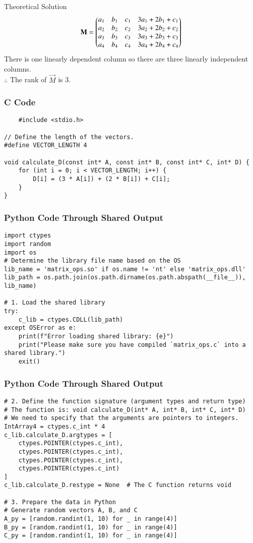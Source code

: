 \documentclass{beamer}
\begin{document}
\begin{frame}{Theoretical Solution}
\begin{align}
    \mathbf{M}=\begin{pmatrix}a_1 & b_1 & c_1 & 3a_1+2b_1+c_1\\
a_2 & b_2 & c_2 & 3a_2+2b_2+c_2 \\
a_3 & b_3 & c_3 & 3a_3+2b_3+c_3 \\
a_4 & b_4 & c_4 & 3a_4+2b_4+c_4\end{pmatrix}
\end{align}
There is one linearly dependent column so there are three linearly independent columns.\\
$\therefore$ The rank of $\vec{M}$ is 3.
\end{frame}
\begin{frame}[fragile]
\frametitle{C Code}
\begin{lstlisting}
    #include <stdio.h>

// Define the length of the vectors.
#define VECTOR_LENGTH 4

void calculate_D(const int* A, const int* B, const int* C, int* D) {
    for (int i = 0; i < VECTOR_LENGTH; i++) {
        D[i] = (3 * A[i]) + (2 * B[i]) + C[i];
    }
}
\end{lstlisting}
\end{frame}
\begin{frame}[fragile]
\frametitle{Python Code Through Shared Output}
\begin{lstlisting}
import ctypes
import random
import os
# Determine the library file name based on the OS
lib_name = 'matrix_ops.so' if os.name != 'nt' else 'matrix_ops.dll'
lib_path = os.path.join(os.path.dirname(os.path.abspath(__file__)), lib_name)

# 1. Load the shared library
try:
    c_lib = ctypes.CDLL(lib_path)
except OSError as e:
    print(f"Error loading shared library: {e}")
    print("Please make sure you have compiled `matrix_ops.c` into a shared library.")
    exit()
\end{lstlisting}
\end{frame}
\begin{frame}[fragile]
\frametitle{Python Code Through Shared Output}
\begin{lstlisting}
# 2. Define the function signature (argument types and return type)
# The function is: void calculate_D(int* A, int* B, int* C, int* D)
# We need to specify that the arguments are pointers to integers.
IntArray4 = ctypes.c_int * 4
c_lib.calculate_D.argtypes = [
    ctypes.POINTER(ctypes.c_int),
    ctypes.POINTER(ctypes.c_int),
    ctypes.POINTER(ctypes.c_int),
    ctypes.POINTER(ctypes.c_int)
]
c_lib.calculate_D.restype = None  # The C function returns void

# 3. Prepare the data in Python
# Generate random vectors A, B, and C
A_py = [random.randint(1, 10) for _ in range(4)]
B_py = [random.randint(1, 10) for _ in range(4)]
C_py = [random.randint(1, 10) for _ in range(4)]
\end{lstlisting}
\end{frame}
\end{document}
